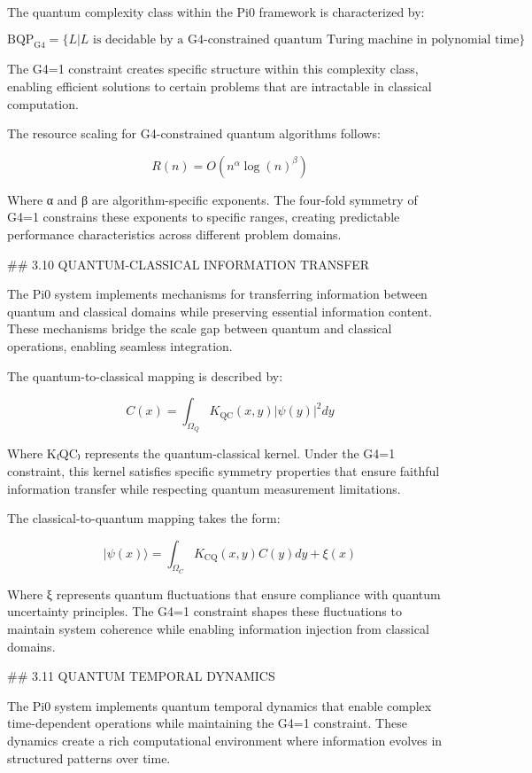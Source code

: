 The quantum complexity class within the Pi0 framework is characterized by:

$$\text{BQP}_{\text{G4}} = \{L | L \text{ is decidable by a G4-constrained quantum Turing machine in polynomial time}\}$$

The G4=1 constraint creates specific structure within this complexity class, enabling efficient solutions to certain problems that are intractable in classical computation.

The resource scaling for G4-constrained quantum algorithms follows:

$$R(n) = O(n^{\alpha} \log(n)^{\beta})$$

Where α and β are algorithm-specific exponents. The four-fold symmetry of G4=1 constrains these exponents to specific ranges, creating predictable performance characteristics across different problem domains.

## 3.10 QUANTUM-CLASSICAL INFORMATION TRANSFER

The Pi0 system implements mechanisms for transferring information between quantum and classical domains while preserving essential information content. These mechanisms bridge the scale gap between quantum and classical operations, enabling seamless integration.

The quantum-to-classical mapping is described by:

$$C(x) = \int_{\Omega_Q} K_{\text{QC}}(x,y) |\psi(y)|^2 dy$$

Where K₍QC₎ represents the quantum-classical kernel. Under the G4=1 constraint, this kernel satisfies specific symmetry properties that ensure faithful information transfer while respecting quantum measurement limitations.

The classical-to-quantum mapping takes the form:

$$|\psi(x)\rangle = \int_{\Omega_C} K_{\text{CQ}}(x,y) C(y) dy + \xi(x)$$

Where ξ represents quantum fluctuations that ensure compliance with quantum uncertainty principles. The G4=1 constraint shapes these fluctuations to maintain system coherence while enabling information injection from classical domains.

## 3.11 QUANTUM TEMPORAL DYNAMICS

The Pi0 system implements quantum temporal dynamics that enable complex time-dependent operations while maintaining the G4=1 constraint. These dynamics create a rich computational environment where information evolves in structured patterns over time.

